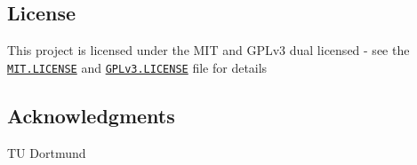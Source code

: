 \subsection*{License}

This project is licensed under the M\+IT and G\+P\+Lv3 dual licensed -\/ see the \href{MIT.LICENSE}{\tt M\+I\+T.\+L\+I\+C\+E\+N\+SE} and \href{GPLv3.LICENSE}{\tt G\+P\+Lv3.\+L\+I\+C\+E\+N\+SE} file for details

\subsection*{Acknowledgments}


\begin{DoxyItemize}
\item TU Dortmund 
\end{DoxyItemize}